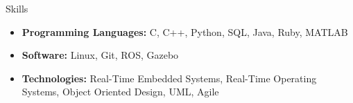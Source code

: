\documentclass[]{../mcdowellcv}
\begin{document}
\begin{cvsection}{Skills}
    \begin{cvsubsection}{}{}{}
        \begin{itemize}
            \item \textbf{Programming Languages:} C, C++, Python, SQL, Java, Ruby, MATLAB
            \item \textbf{Software:} Linux, Git, ROS, Gazebo
            \item \textbf{Technologies:} Real-Time Embedded Systems, Real-Time Operating Systems, Object Oriented Design, UML, Agile
        \end{itemize}
    \end{cvsubsection}
\end{cvsection}
\end{document}
